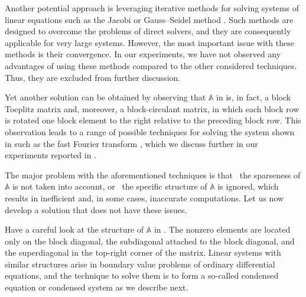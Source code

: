 Another potential approach is leveraging iterative methods for solving systems
of linear equations such as the Jacobi or Gauss--Seidel method \cite{press2007}.
Such methods are designed to overcome the problems of direct solvers, and they
are consequently applicable for very large systems. However, the most important
issue with these methods is their convergence. In our experiments, we have not
observed any advantages of using these methods compared to the other considered
techniques. Thus, they are excluded from further discussion.

Yet another solution can be obtained by observing that $\mathbb{A}$ in
 is, in fact, a block Toeplitz matrix and, moreover,
a block-circulant matrix, in which each block row is rotated one block element
to the right relative to the preceding block row. This observation leads to a
range of possible techniques for solving the system shown in
 such as the fast Fourier transform
\cite{mazancourt1983}, which we discuss further in our experiments reported in
.

The major problem with the aforementioned techniques is that \one~the sparseness
of $\mathbb{A}$ is not taken into account, or \two~the specific structure of
$\mathbb{A}$ is ignored, which results in inefficient and, in some cases,
inaccurate computations. Let us now develop a solution that does not have these
issues.

Have a careful look at the structure of $\mathbb{A}$ in
. The nonzero elements are located only on the block
diagonal, the subdiagonal attached to the block diagonal, and the superdiagonal
in the top-right corner of the matrix. Linear systems with similar structures
arise in boundary value problems of ordinary differential equations, and the
technique to solve them is to form a so-called condensed equation or condensed
system \cite{stoer2002} as we describe next.

